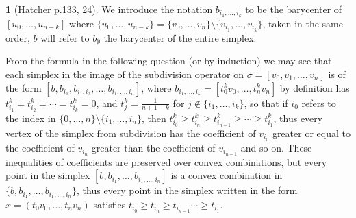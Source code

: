 \documentclass[10.5pt]{article}
\theoremstyle{definition}
\newtheorem{pb}{}
\newcommand{\set}[1]{\{#1\}}
\begin{document}
    \begin{pb}[Hatcher p.133, 24]
        We introduce the notation \(b_{i_1,\hdots,i_k}\) to be the barycenter of \([u_0,\hdots,u_{n-k}]\) where \(\set{u_0,\hdots,u_{n-k}} = \set{v_0,\hdots,v_n}\setminus \set{v_{i_1},\hdots,v_{i_k}}\), taken in the same order, \(b\) will refer to \(b_\emptyset\) the barycenter of the entire simplex.

        From the formula in the following question (or by induction) we may see that each simplex in the image of the subdivision operator on \(\sigma = [v_0,v_1,\hdots,v_n]\) is of the form \([b,b_{i_1},b_{i_1,i_2},\hdots,b_{i_1,\hdots,i_n}]\), where \(b_{i_1,\hdots,i_k} = [t^k_0v_0,\hdots,t^k_n v_n]\) by definition has \(t^k_{i_1} = t^k_{i_2} =\cdots = t^k_{i_k} = 0\), and \(t^k_j = \frac{1}{n+1-k}\) for \(j \not \in \set{i_1,\hdots,i_k}\), so that if \(i_0\) refers to the index in \(\set{0,\hdots,n} \setminus \set{i_1,\hdots,i_n}\), then \(t^k_{i_0} \geq t^k_{i_n} \geq t^k_{i_{n-1}} \geq \cdots \geq t^k_{i_1}\), thus every vertex of the simplex from subdivision has the coefficient of \(v_{i_0}\) greater or equal to the coefficient of \(v_{i_n}\) greater than the coefficient of \(v_{i_{n-1}}\) and so on. These inequalities of coefficients are preserved over convex combinations, but every point in the simplex \([b,b_{i_1},\hdots,b_{i_1,\hdots,i_n}]\) is a convex combination in \(\set{b,b_{i_1},\hdots,b_{i_1,\hdots,i_n}}\), thus every point in the simplex written in the form \(x = (t_0v_0,\hdots,t_nv_n)\) satisfies \(t_{i_0} \geq t_{i_n} \geq t_{i_{n-1}} \cdots \geq t_{i_1}\).
    \end{pb}
\end{document}
